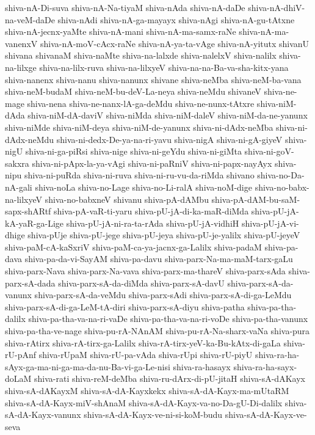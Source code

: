 {shiva-nA-Di-suva
shiva-nA-Na-tiyaM
shiva-nAda
shiva-nA-daDe
shiva-nA-dhiV-na-veM-daDe
shiva-nAdi
shiva-nA-ga-mayayx
shiva-nAgi
shiva-nA-gu-tAtxne
shiva-nA-jecnx-yaMte
shiva-nA-mani
shiva-nA-ma-samx-raNe
shiva-nA-ma-vanenxV
shiva-nA-moV-cAcx-raNe
shiva-nA-ya-ta-vAge
shiva-nA-yitutx
shivanU
shivana
shivanaM
shiva-naMte
shiva-na-lalxde
shiva-nalelxV
shiva-nalilx
shiva-na-lilxge
shiva-na-lilx-ruva
shiva-na-lilxyeV
shiva-na-na-Ba-va-sha-kitx-yana
shiva-nanenx
shiva-nanu
shiva-nanunx
shivane
shiva-neMba
shiva-neM-ba-vana
shiva-neM-budaM
shiva-neM-bu-deV-La-neya
shiva-neMdu
shivaneV
shiva-ne-mage
shiva-nena
shiva-ne-nanx-lA-ga-deMdu
shiva-ne-nunx-tAtxre
shiva-niM-dAda
shiva-niM-dA-daviV
shiva-niMda
shiva-niM-daleV
shiva-niM-da-ne-yanunx
shiva-niMde
shiva-niM-deya
shiva-niM-de-yanunx
shiva-ni-dAdx-neMba
shiva-ni-dAdx-neMdu
shiva-ni-dedx-De-ya-na-ri-yavu
shiva-nigA
shiva-ni-gA-giyeV
shiva-nigU
shiva-ni-ga-piRsi
shiva-nige
shiva-ni-geYdu
shiva-ni-giMta
shiva-ni-goV-sakxra
shiva-ni-pApx-la-ya-vAgi
shiva-ni-paRniV
shiva-ni-papx-nayAyx
shiva-nipu
shiva-ni-puRda
shiva-ni-ruva
shiva-ni-ru-vu-da-riMda
shivano
shiva-no-Da-nA-gali
shiva-noLa
shiva-no-Lage
shiva-no-Li-ralA
shiva-noM-dige
shiva-no-babx-na-lilxyeV
shiva-no-babxneV
shivanu
shiva-pA-dAMbu
shiva-pA-dAM-bu-saM-sapx-shARtf
shiva-pA-vaR-ti-yaru
shiva-pU-jA-di-ka-maR-diMda
shiva-pU-jA-kA-yaR-ga-Lige
shiva-pU-jA-ni-ra-ta-rAda
shiva-pU-jA-vidhiH
shiva-pU-jA-vi-dhige
shiva-pUje
shiva-pU-jege
shiva-pU-jeya
shiva-pU-je-yalilx
shiva-pU-jeyeV
shiva-paM-cA-kaSxriV
shiva-paM-ca-ya-jacnx-ga-Lalilx
shiva-padaM
shiva-pa-dava
shiva-pa-da-vi-SayAM
shiva-pa-davu
shiva-parx-Na-ma-maM-tarx-gaLu
shiva-parx-Nava
shiva-parx-Na-vava
shiva-parx-ma-thareV
shiva-parx-sAda
shiva-parx-sA-dada
shiva-parx-sA-da-diMda
shiva-parx-sA-davU
shiva-parx-sA-da-vanunx
shiva-parx-sA-da-veMdu
shiva-parx-sAdi
shiva-parx-sA-di-ga-LeMdu
shiva-parx-sA-di-ga-LeM-tA-diri
shiva-parx-sA-diyu
shiva-patha
shiva-pa-tha-dalilx
shiva-pa-tha-va-na-ri-vaDe
shiva-pa-tha-va-na-ri-voDe
shiva-pa-tha-vanunx
shiva-pa-tha-ve-nage
shiva-pu-rA-NAnAM
shiva-pu-rA-Na-sharx-vaNa
shiva-pura
shiva-rAtirx
shiva-rA-tirx-ga-Lalilx
shiva-rA-tirx-yeV-ka-Bu-kAtx-di-gaLa
shiva-rU-pAnf
shiva-rUpaM
shiva-rU-pa-vAda
shiva-rUpi
shiva-rU-piyU
shiva-ra-ha-sAyx-ga-ma-ni-ga-ma-da-nu-Ba-vi-ga-Le-nisi
shiva-ra-hasayx
shiva-ra-ha-sayx-doLaM
shiva-rati
shiva-reM-deMba
shiva-ru-dArx-di-pU-jitaH
shiva-sA-dAKayx
shiva-sA-dAKayxM
shiva-sA-dA-Kayxkekx
shiva-sA-dA-Kayx-ma-mUtaRM
shiva-sA-dA-Kayx-miV-shAnaM
shiva-sA-dA-Kayx-va-no-Da-gU-Di-dalilx
shiva-sA-dA-Kayx-vanunx
shiva-sA-dA-Kayx-ve-ni-si-koM-budu
shiva-sA-dA-Kayx-ve-seva
}
